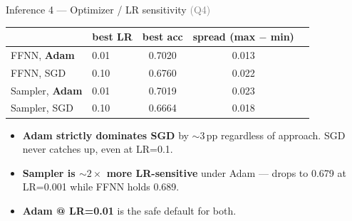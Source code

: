 \documentclass[aspectratio=169,10pt]{beamer}
\begin{document}
\begin{frame}{Inference 4 --- Optimizer / LR sensitivity \hfill \small\textcolor{gray}{(Q4)}}
  \centering
  \begin{tabular}{@{}llcc c@{}}
    \toprule
                       & \textbf{best LR} & \textbf{best acc} & \textbf{spread (max $-$ min)} \\
    \midrule
    FFNN, \textbf{Adam}    & 0.01 & 0.7020 & 0.013 \\
    FFNN, SGD              & 0.10 & 0.6760 & 0.022 \\
    Sampler, \textbf{Adam} & 0.01 & 0.7019 & 0.023 \\
    Sampler, SGD           & 0.10 & 0.6664 & 0.018 \\
    \bottomrule
  \end{tabular}

  \bigskip
  \begin{itemize}
    \item \textbf{Adam strictly dominates SGD} by $\sim$3\,pp regardless of approach. SGD never catches up, even at LR=0.1.
    \item \textbf{Sampler is $\sim 2\times$ more LR-sensitive} under Adam --- drops to 0.679 at LR=0.001 while FFNN holds 0.689.
    \item \textbf{Adam @ LR=0.01} is the safe default for both.
  \end{itemize}
\end{frame}
\end{document}
